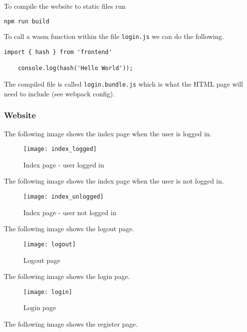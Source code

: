 \documentclass[../documentation.tex]{subfiles}
\begin{document}
To compile the website to static files run
\begin{lstlisting}[language=bash]
    npm run build
\end{lstlisting}

To call a wasm function within the file \texttt{login.js}
we can do the following.

\begin{lstlisting}[style=js]
    import { hash } from 'frontend'

    console.log(hash('Hello World'));
\end{lstlisting}

The compiled file is called \texttt{login.bundle.js}
which is what the HTML page will need to include (see webpack config).

\pagebreak

\subsubsection{Website}

The following image shows the index page when the user is logged in.

\begin{figure}[h]
    \centering
    \texttt{[image: index\_logged]}
    \caption{Index page - user logged in}
\end{figure}

The following image shows the index page when the user is not logged in.

\begin{figure}[h]
    \centering
    \texttt{[image: index\_unlogged]}
    \caption{Index page - user not logged in}
\end{figure}

\pagebreak

The following image shows the logout page.

\begin{figure}[h]
    \centering
    \texttt{[image: logout]}
    \caption{Logout page}
\end{figure}

The following image shows the login page.

\begin{figure}[h]
    \centering
    \texttt{[image: login]}
    \caption{Login page}
\end{figure}

\pagebreak

The following image shows the register page.
\end{document}
